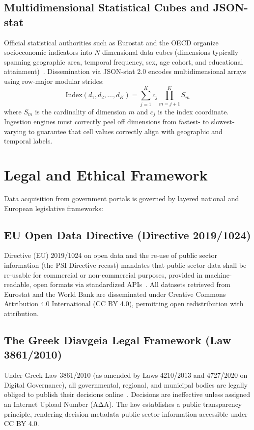 \documentclass[11pt,a4paper]{article}
\begin{document}
\subsection{Multidimensional Statistical Cubes and JSON-stat}
Official statistical authorities such as Eurostat and the OECD organize socioeconomic indicators into $N$-dimensional data cubes (dimensions typically spanning geographic area, temporal frequency, sex, age cohort, and educational attainment)~\citep{eurostat_api, turrell_coding}. Dissemination via JSON-stat 2.0 encodes multidimensional arrays using row-major modular strides:
\begin{equation}
\text{Index}(d_1, d_2, \dots, d_K) = \sum_{j=1}^{K} c_j \prod_{m=j+1}^{K} S_m
\end{equation}
where $S_m$ is the cardinality of dimension $m$ and $c_j$ is the index coordinate. Ingestion engines must correctly peel off dimensions from fastest- to slowest-varying to guarantee that cell values correctly align with geographic and temporal labels.

\section{Legal and Ethical Framework}
Data acquisition from government portals is governed by layered national and European legislative frameworks:

\subsection{EU Open Data Directive (Directive 2019/1024)}
Directive (EU) 2019/1024 on open data and the re-use of public sector information (the PSI Directive recast) mandates that public sector data shall be re-usable for commercial or non-commercial purposes, provided in machine-readable, open formats via standardized APIs~\citep{eu2019opendata}. All datasets retrieved from Eurostat and the World Bank are disseminated under Creative Commons Attribution 4.0 International (CC BY 4.0), permitting open redistribution with attribution.

\subsection{The Greek Diavgeia Legal Framework (Law 3861/2010)}
Under Greek Law 3861/2010 (as amended by Laws 4210/2013 and 4727/2020 on Digital Governance), all governmental, regional, and municipal bodies are legally obliged to publish their decisions online~\citep{greek_law_3861}. Decisions are ineffective unless assigned an Internet Upload Number (ΑΔΑ). The law establishes a public transparency principle, rendering decision metadata public sector information accessible under CC BY 4.0.
\end{document}
